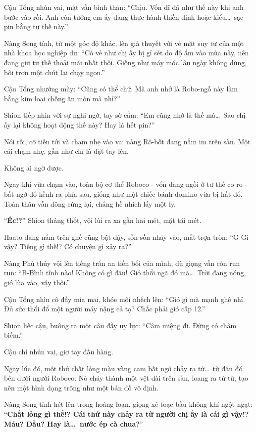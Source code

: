 \documentclass[../main.tex]{subfiles}
\begin{document}
Cậu Tổng nhún vai, mặt vẫn bình thản: ``Chịu. Vốn dĩ đã như thế này khi anh bước vào rồi. Anh còn tưởng em ấy đang thực hành thiền định hoặc kiểu\dots\ sạc pin bằng tư thế này.''

Nàng Song tính, từ một góc độ khác, lên giả thuyết với vẻ mặt suy tư của một nhà khoa học nghiệp dư: ``Có vẻ như chị ấy bị gỉ sét do độ ẩm vào mùa này, nên đang giữ tư thế thoải mái nhất thôi. Giống như máy móc lâu ngày không dùng, bôi trơn một chút lại chạy ngon.''

Cậu Tổng nhướng mày: ``Cũng có thể chứ. Mà anh nhớ là Robo-ngố này làm bằng kim loại chống ăn mòn mà nhỉ?''

Shion tiếp nhìn với sự nghi ngờ, tay sờ cằm: ``Em cũng nhớ là thế mà\dots\ Sao chị ấy lại không hoạt động thế này? Hay là hết pin?''

Nói rồi, cô tiến tới và chạm nhẹ vào vai nàng Rô-bốt đang nằm im trên sàn. Một cái chạm nhẹ, gần như chỉ là đặt tay lên.

Không ai ngờ được.

Ngay khi vừa chạm vào, toàn bộ cơ thể Roboco - vốn đang ngồi ở tư thế co ro - bất ngờ đổ kềnh ra phía sau, giống như một chiếc bánh domino vừa bị hất đổ. Toàn thân vẫn đông cứng lại, chẳng hề nhích lấy một ly.


``\textbf{Éc!?}''  Shion thảng thốt, vội lùi ra xa gần hai mét, mặt tái mét.

Haato đang nằm trên ghế cũng bật dậy, sồn sồn nhảy vào, mắt trợn tròn: ``G-Gì vậy? Tiếng gì thế!? Có chuyện gì xảy ra?''

Nàng Phù thủy vội lên tiếng trấn an tiền bối của mình, dù giọng vẫn còn run run: ``B-Bình tĩnh nào! Không có gì đâu! Gió thổi ngã đó mà\dots\ Trời đang nóng, gió lùa vào, vậy thôi.''

Cậu Tổng nhìn cô đầy mỉa mai, khóe môi nhếch lên: ``Gió gì mà mạnh ghê nhỉ. Đủ sức thổi đổ một người máy nặng cả tạ? Chắc phải gió cấp 12.''

Shion liếc cậu, buông ra một câu đầy uy lực: ``Câm miệng đi. Đừng có châm biếm.''

Cậu chỉ nhún vai, giơ tay đầu hàng.

Ngay lúc đó, một thứ chất lỏng màu vàng cam bất ngờ chảy ra từ\dots\ từ đâu đó bên dưới người Roboco. Nó chảy thành một vệt dài trên sàn, loang ra từ từ, tạo nên một hình dạng trông như một bản đồ vô định.


Nàng Song tính hét lên trong hoảng loạn, giọng xé toạc bầu không khí ngột ngạt: ``\textbf{Chất lỏng gì thế!? Cái thứ này chảy ra từ người chị ấy là cái gì vậy!? Máu? Dầu? Hay là\dots\ nước ép cà chua?}''
\end{document}
